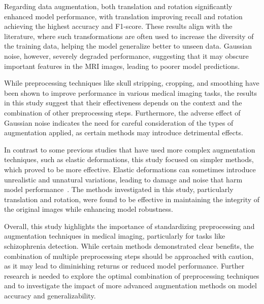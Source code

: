 Regarding data augmentation, both translation and rotation significantly enhanced model performance, with translation improving recall and rotation achieving the highest accuracy and F1-score. These results align with the literature, where such transformations are often used to increase the diversity of the training data, helping the model generalize better to unseen data. Gaussian noise, however, severely degraded performance, suggesting that it may obscure important features in the MRI images, leading to poorer model predictions.

While preprocessing techniques like skull stripping, cropping, and smoothing have been shown to improve performance in various medical imaging tasks, the results in this study suggest that their effectiveness depends on the context and the combination of other preprocessing steps. Furthermore, the adverse effect of Gaussian noise indicates the need for careful consideration of the types of augmentation applied, as certain methods may introduce detrimental effects.

In contrast to some previous studies that have used more complex augmentation techniques, such as elastic deformations, this study focused on simpler methods, which proved to be more effective. Elastic deformations can sometimes introduce unrealistic and unnatural variations, leading to damage and noise that harm model performance~\cite{Mok2018}. The methods investigated in this study, particularly translation and rotation, were found to be effective in maintaining the integrity of the original images while enhancing model robustness.

Overall, this study highlights the importance of standardizing preprocessing and augmentation techniques in medical imaging, particularly for tasks like schizophrenia detection. While certain methods demonstrated clear benefits, the combination of multiple preprocessing steps should be approached with caution, as it may lead to diminishing returns or reduced model performance. Further research is needed to explore the optimal combination of preprocessing techniques and to investigate the impact of more advanced augmentation methods on model accuracy and generalizability.





